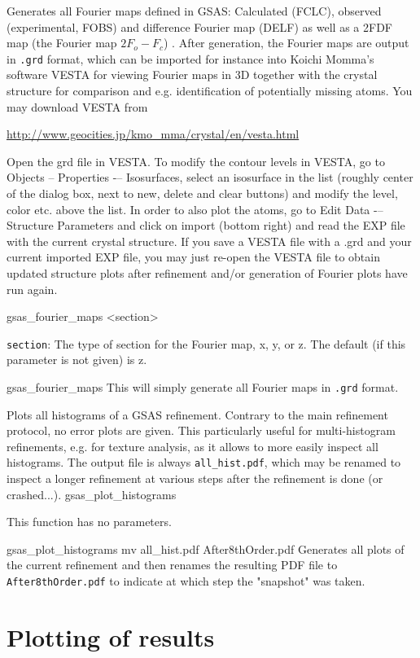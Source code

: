 {
Generates all Fourier maps defined in GSAS: Calculated (FCLC), observed (experimental, FOBS) and difference Fourier map (DELF) as well as a 2FDF map (the Fourier map $2F_o-F_c$) . After generation, the Fourier maps are output in \texttt{.grd} format, which can be imported for instance into Koichi Momma's software VESTA for viewing Fourier maps in 3D together with the crystal structure for comparison and e.g. identification of potentially missing atoms. You may download VESTA from

\url{http://www.geocities.jp/kmo_mma/crystal/en/vesta.html}

Open the grd file in VESTA. To modify the contour levels in VESTA, go to Objects -- Properties -– Isosurfaces, select an isosurface in the list (roughly center of the dialog box, next to new, delete and clear buttons) and modify the level, color etc. above the list. In order to also plot the atoms, go to Edit Data -– Structure Parameters and click on import (bottom right) and read the EXP file with the current crystal structure. If you save a VESTA file with a .grd and your current imported EXP file, you may just re-open the VESTA file to obtain updated structure plots after refinement and/or generation of Fourier plots have run again.
}{
gsas\_fourier\_maps <section>
}{
\item \texttt{section}: The type of section for the Fourier map, x, y, or z. The default (if this parameter is not given) is z.
}{
gsas\_fourier\_maps
}{
This will simply generate all Fourier maps in \texttt{.grd} format.
}

{
Plots all histograms of a GSAS refinement. Contrary to the main refinement protocol, no error plots are given. This particularly useful for multi-histogram refinements, e.g. for texture analysis, as it allows to more easily inspect all histograms. The output file is always \texttt{all\_hist.pdf}, which may be renamed to inspect a longer refinement at various steps after the refinement is done (or crashed...).
}{
gsas\_plot\_histograms
}{
\item This function has no parameters.
}{
gsas\_plot\_histograms
mv all\_hist.pdf After8thOrder.pdf
}{
Generates all plots of the current refinement and then renames the resulting PDF file to \texttt{After8thOrder.pdf} to indicate at which step the "snapshot" was taken.
}

\section{Plotting of results}


